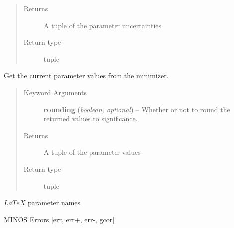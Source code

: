 \documentclass[a4paper,10pt,english]{sphinxmanual}
\begin{document}
\begin{fulllineitems}
\begin{fulllineitems}
\begin{quote}
\begin{description}
\item[{Returns}] \leavevmode
A tuple of the parameter uncertainties

\item[{Return type}] \leavevmode
tuple

\end{description}\end{quote}

\end{fulllineitems}


\begin{fulllineitems}
\label{module_doc:kafe.fit.Fit.get_parameter_values}
Get the current parameter values from the minimizer.
\begin{quote}\begin{description}
\item[{Keyword Arguments}] \leavevmode
\textbf{rounding} (\emph{boolean, optional}) --
Whether or not to round the returned values to significance.

\item[{Returns}] \leavevmode
A tuple of the parameter values

\item[{Return type}] \leavevmode
tuple

\end{description}\end{quote}

\end{fulllineitems}


\begin{fulllineitems}
\label{module_doc:kafe.fit.Fit.latex_parameter_names}
\(LaTeX\) parameter names

\end{fulllineitems}


\begin{fulllineitems}
\label{module_doc:kafe.fit.Fit.minos_errors}
MINOS Errors {[}err, err+, err-, gcor{]}

\end{fulllineitems}


\end{fulllineitems}
\end{document}
